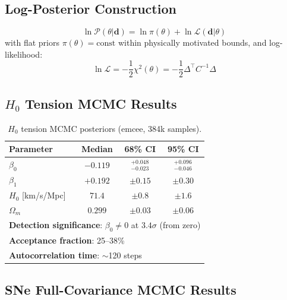 \documentclass[twocolumn,showpacs,preprintnumbers,amsmath,amssymb,prl]{revtex4-2}
\begin{document}
\subsection{Log-Posterior Construction}

\begin{equation}
\ln \mathcal{P}(\theta | \mathbf{d}) = \ln \pi(\theta) + \ln \mathcal{L}(\mathbf{d} | \theta)
\end{equation}
with flat priors $\pi(\theta) = \text{const}$ within physically motivated bounds, and log-likelihood:
\begin{equation}
\ln \mathcal{L} = -\frac{1}{2}\chi^2(\theta) = -\frac{1}{2}\Delta^\top C^{-1} \Delta
\end{equation}

\subsection{$H_0$ Tension MCMC Results}

\begin{table}[h]
\caption{$H_0$ tension MCMC posteriors (emcee, 384k samples).}
\label{tab:h0_mcmc}
\begin{ruledtabular}
\begin{tabular}{lccc}
Parameter & Median & 68\% CI & 95\% CI \\
\hline
$\beta_0$ & $-0.119$ & $^{+0.048}_{-0.023}$ & $^{+0.096}_{-0.046}$ \\
$\beta_1$ & $+0.192$ & $\pm 0.15$ & $\pm 0.30$ \\
$H_0$ [km/s/Mpc] & $71.4$ & $\pm 0.8$ & $\pm 1.6$ \\
$\Omega_m$ & $0.299$ & $\pm 0.03$ & $\pm 0.06$ \\
\hline
\multicolumn{4}{l}{\textbf{Detection significance}: $\beta_0 \neq 0$ at $3.4\sigma$ (from zero)} \\
\multicolumn{4}{l}{\textbf{Acceptance fraction}: 25--38\%} \\
\multicolumn{4}{l}{\textbf{Autocorrelation time}: $\sim$120 steps} \\
\end{tabular}
\end{ruledtabular}
\end{table}

\subsection{SNe Full-Covariance MCMC Results}
\end{document}
